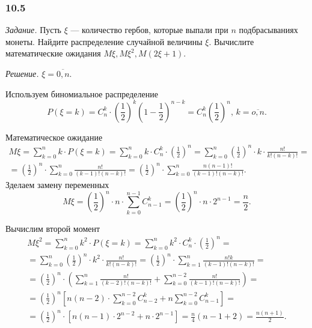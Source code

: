 \subsubsection*{10.5}

\textit{Задание.} Пусть $ \xi $ --- количество гербов, которые выпали при $n$ подбрасываниях монеты.
Найдите распределение случайной величины $ \xi $.
Вычислите математические ожидания $M \xi, M \xi^2, M \left( 2 \xi + 1 \right) $.

\textit{Решение.} $ \xi = \overline{0, n}$.

Используем биномиальное распределение
$$P \left( \xi = k \right) =
C_n^k \cdot \left( \frac{1}{2} \right)^k \left( 1 - \frac{1}{2} \right)^{n-k} =
C_n^k \left( \frac{1}{2} \right)^n, \,
k = \overline{o, n}.$$

Математическое ожидание
\begin{equation*}
\begin{split}
M \xi =
\sum \limits_{k=0}^n k \cdot P \left( \xi = k \right) =
\sum \limits_{k=0}^n k \cdot C_n^k \cdot \left( \frac{1}{2} \right)^n =
\sum \limits_{k=0}^n \left( \frac{1}{2} \right)^n \cdot k \cdot \frac{n!}{k! \left( n-k \right)!} = \\
= \left( \frac{1}{2} \right)^n \cdot \sum \limits_{k=0}^n \frac{n!}{ \left( k - 1 \right)! \left( n - k \right)!} =
\left( \frac{1}{2} \right)^n \cdot \sum \limits_{k=0}^n \frac{n \left( n-1 \right)!}{ \left( k-1 \right)! \left( n-k \right)!}.
\end{split}
\end{equation*}
Зделаем замену переменных
$$M \xi =
\left( \frac{1}{2} \right)^n \cdot n \cdot \sum \limits_{k=0}^{n-1} C_{n-1}^k =
\left( \frac{1}{2} \right)^n \cdot n \cdot 2^{n-1} =
\frac{n}{2}.$$

Вычислим второй момент
\begin{equation*}
\begin{split}
M \xi^2 =
\sum \limits_{k=0}^n k^2 \cdot P \left( \xi = k \right) =
\sum \limits_{k=0}^n k^2 \cdot C_n^k \cdot \left( \frac{1}{2} \right)^n = \\
= \sum \limits_{k=0}^n \left( \frac{1}{2} \right)^n \cdot k^2 \cdot \frac{n!}{k! \left( n-k \right)!} =
\left( \frac{1}{2} \right)^n \cdot \sum \limits_{k=1}^n \frac{n!k}{ \left( k-1 \right)! \left( n-k \right)!} = \\
= \left( \frac{1}{2} \right)^n \cdot
\left( \sum \limits_{k=1}^n \frac{n!}{ \left( k-2 \right)! \left( n-k \right)!} + \sum \limits_{k=0}^{n-2} \frac{n!}{ \left( k-1 \right)! \left( n-k \right)!} \right) = \\
= \left( \frac{1}{2} \right)^n \left[ n \left( n-2 \right) \cdot \sum \limits_{k=0}^{n-2} C_{n-2}^k + n \sum \limits_{k=0}^{n-2} C_{n-1}^k \right] = \\
= \left( \frac{1}{2} \right)^n \cdot \left[ n \left( n-1 \right) \cdot 2^{n-2} + n \cdot 2^{n-1} \right] =
\frac{n}{4} \left( n-1+2 \right) =
\frac{n \left( n+1 \right) }{2}.
\end{split}
\end{equation*}

